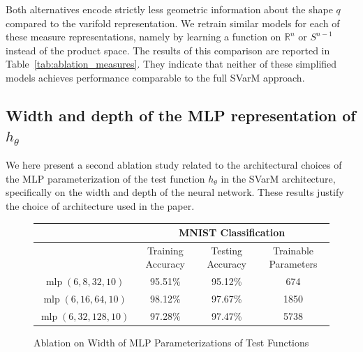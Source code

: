 \documentclass[11pt]{article}
\newcommand{\R}{\mathbb{R}}
\begin{document}
Both alternatives encode strictly less geometric information about the shape $q$ compared to the varifold representation. We retrain similar models for each of these measure representations, namely by learning a function on $\R^n$ or $S^{n-1}$ instead of the product space. The results of this comparison are reported in Table~\ref{tab:ablation_measures}. They indicate that neither of these simplified models achieves performance comparable to the full SVarM approach.

\subsection{Width and depth of the MLP representation of $h_\theta$}
We here present a second ablation study related to the architectural choices of the MLP parameterization of the test function $h_\theta$ in the SVarM architecture, specifically on the width and depth of the neural network. These results justify the choice of architecture used in the paper.  
\begin{figure}[h!]
    \centering
    \begin{tabular}{|| c | c c c ||} 
      \hline
      &\multicolumn{3}{c||}{MNIST Classification}\\
      \hline
      & Training Accuracy & Testing Accuracy & Trainable Parameters\\
      \hline
      $\operatorname{mlp}(6,8,32,10)$& 95.51\% & 95.12\% &674\\
      $\operatorname{mlp}(6,16,64,10)$& 98.12\%&97.67\%&1850\\
      $\operatorname{mlp}(6,32,128,10)$& 97.28\% & 97.47\% &5738\\
      \hline
    \end{tabular}
  \caption{Ablation on Width of MLP Parameterizations of Test Functions }\label{tab:ablation_width}
\end{figure}
\end{document}
